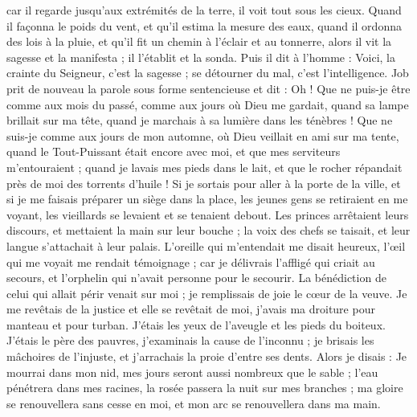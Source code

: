 \begin{multicols}{2}
car il regarde jusqu'aux extrémités de la terre, il voit tout sous les cieux.
Quand il façonna le poids du vent, et qu'il estima la mesure des eaux,
quand il ordonna des lois à la pluie, et qu'il fit un chemin à l'éclair et au tonnerre,
alors il vit la sagesse et la manifesta ; il l'établit et la sonda.
Puis il dit à l'homme : Voici, la crainte du Seigneur, c'est la sagesse ; se détourner du mal, c'est l'intelligence.
\VerseOne{}Job prit de nouveau la parole sous forme sentencieuse et dit :
Oh ! Que ne puis-je être comme aux mois du passé, comme aux jours où Dieu me gardait,
quand sa lampe brillait sur ma tête, quand je marchais à sa lumière dans les ténèbres !
Que ne suis-je comme aux jours de mon automne, où Dieu veillait en ami sur ma tente,
quand le Tout-Puissant était encore avec moi, et que mes serviteurs m'entouraient ;
quand je lavais mes pieds dans le lait, et que le rocher répandait près de moi des torrents d'huile !
Si je sortais pour aller à la porte de la ville, et si je me faisais préparer un siège dans la place,
les jeunes gens se retiraient en me voyant, les vieillards se levaient et se tenaient debout.
Les princes arrêtaient leurs discours, et mettaient la main sur leur bouche ;
la voix des chefs se taisait, et leur langue s'attachait à leur palais.
L'oreille qui m'entendait me disait heureux, l'œil qui me voyait me rendait témoignage ;
car je délivrais l'affligé qui criait au secours, et l'orphelin qui n'avait personne pour le secourir.
La bénédiction de celui qui allait périr venait sur moi ; je remplissais de joie le cœur de la veuve.
Je me revêtais de la justice et elle se revêtait de moi, j'avais ma droiture pour manteau et pour turban.
J'étais les yeux de l'aveugle et les pieds du boiteux.
J'étais le père des pauvres, j'examinais la cause de l'inconnu ;
je brisais les mâchoires de l'injuste, et j'arrachais la proie d'entre ses dents.
Alors je disais : Je mourrai dans mon nid, mes jours seront aussi nombreux que le sable ;
l'eau pénétrera dans mes racines, la rosée passera la nuit sur mes branches ;
ma gloire se renouvellera sans cesse en moi, et mon arc se renouvellera dans ma main.

\end{multicols}
